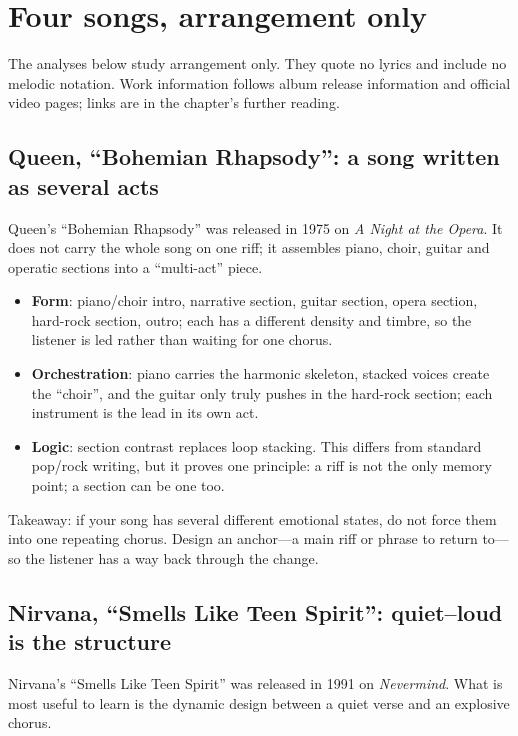 \section{Four songs, arrangement only}
\label{sec:rock-cases}

The analyses below study arrangement only. They quote no lyrics and include no melodic notation. Work information follows album release information and official video pages; links are in the chapter's further reading.

\subsection{Queen, ``Bohemian Rhapsody'': a song written as several acts}
\label{sec:rock-case-bohemian}

Queen's ``Bohemian Rhapsody'' was released in 1975 on \emph{A Night at the Opera}. It does not carry the whole song on one riff; it assembles piano, choir, guitar and operatic sections into a ``multi-act'' piece.

\begin{itemize}
\item \textbf{Form}: piano/choir intro, narrative section, guitar section, opera section, hard-rock section, outro; each has a different density and timbre, so the listener is led rather than waiting for one chorus.
\item \textbf{Orchestration}: piano carries the harmonic skeleton, stacked voices create the ``choir'', and the guitar only truly pushes in the hard-rock section; each instrument is the lead in its own act.
\item \textbf{Logic}: section contrast replaces loop stacking. This differs from standard pop/rock writing, but it proves one principle: a riff is not the only memory point; a section can be one too.
\end{itemize}

Takeaway: if your song has several different emotional states, do not force them into one repeating chorus. Design an anchor---a main riff or phrase to return to---so the listener has a way back through the change.

\subsection{Nirvana, ``Smells Like Teen Spirit'': quiet--loud is the structure}
\label{sec:rock-case-teen-spirit}

Nirvana's ``Smells Like Teen Spirit'' was released in 1991 on \emph{Nevermind}. What is most useful to learn is the dynamic design between a quiet verse and an explosive chorus.

